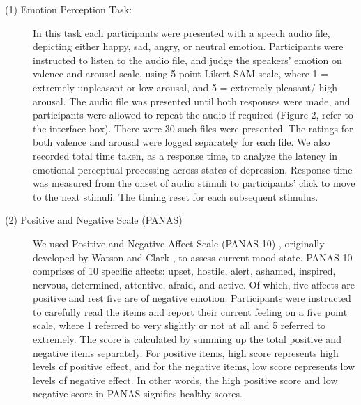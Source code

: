 \documentclass{Interspeech2024}
\begin{document}
\begin{description}
    
\vspace{0.3em}
\item[(1) Emotion Perception Task:] In this task each participants were presented with a speech audio file, depicting either  happy, sad, angry, or neutral emotion. Participants were instructed to listen to the audio file, and judge the speakers' emotion on valence and arousal scale, using 5 point Likert SAM scale, where 1 = extremely unpleasant or low arousal, and 5 = extremely pleasant/ high arousal. The audio file was presented until both responses were made, and participants were allowed to repeat the audio if required (Figure 2, refer to the interface box). There were 30 such files were presented. The ratings for both valence and arousal were logged separately for each file. We also recorded total time taken, as a response time, to analyze the latency in emotional perceptual processing across states of depression. Response time was measured from the onset of audio stimuli to participants' click to move to the next stimuli. The timing reset for each subsequent stimulus. 


\item [(2) Positive and Negative Scale (PANAS)] We used Positive and Negative Affect Scale (PANAS-10) , originally developed by Watson and Clark \cite{watson1992panas} , to assess current mood state. PANAS 10 comprises of 10 specific affects: upset, hostile, alert, ashamed, inspired, nervous, determined, attentive, afraid, and active. Of which, five affects are positive and rest five are of negative emotion. Participants were instructed to carefully read the items and report their current feeling on a five point scale, where 1 referred to very slightly or not at all and 5 referred to extremely. The score is calculated by summing up the total positive and negative items separately. For positive items, high score represents high levels of positive effect, and for the negative items, low score represents low levels of negative effect. In other words, the high positive score and low negative score in PANAS signifies healthy scores. 


\end{description}
\end{document}

